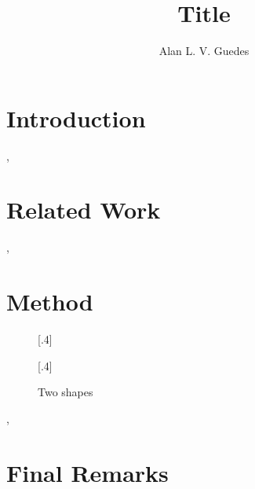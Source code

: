\documentclass[manuscript,screen,nonacm]{acmart}
\begin{document}

\title{Title}
\author{Alan L. V. Guedes}
\renewcommand{\shortauthors}{Guedes, A.L.G.}

\begin{abstract}
\lipsum[1-2]
\end{abstract}

\maketitle

\section{Introduction}
\label{sec:introduction}

\lipsum[1-2]\cite{TeXFAQ}, \cite{Downes04:amsart}

\section{Related Work}
\label{sec:related}

\lipsum[1-2]\cite{Fiorio15}, \cite{Brito09}

\section{Method}
\label{sec:method}

\begin{figure}[!ht]
    \centering
    [.4\textwidth]{
    }
    [.4\textwidth]{
    }
    \caption{Two shapes}\label{fig:shapes}
    \Description{}
\end{figure}

\lipsum[1-2]\cite{Heinz15}, \cite{Fear05}

\section{Final Remarks}
\label{sec:remarks}

\lipsum[1-2]\cite{Carlisle04:Textcase,Braams22:Babel}



\end{document}
